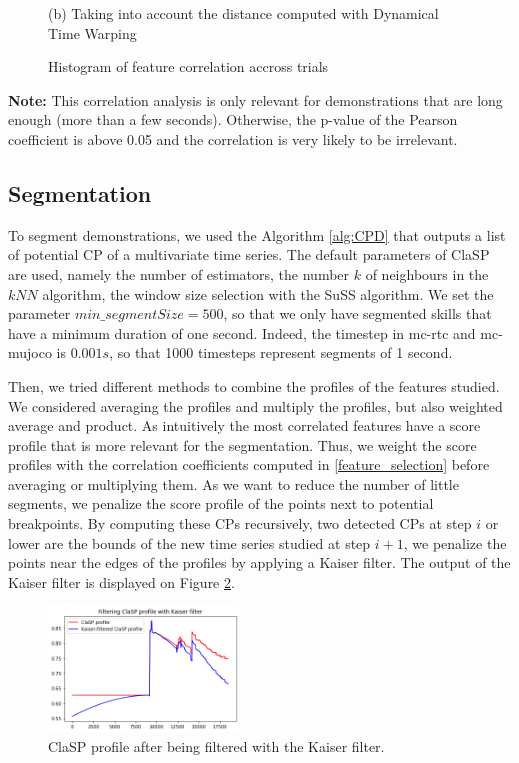 \documentclass[conference]{IEEEtran}
\begin{document}
\begin{figure}[ht]
\begin{minipage}[b]{0.47\linewidth}
    \caption*{(b) Taking into account the  distance computed with Dynamical Time Warping}
    \label{fig:histdtw}
  \end{minipage}

\caption{Histogram of feature correlation accross trials }
  \label{fig:histcorr}
\end{figure}

\textbf{Note:} This correlation analysis is only relevant for demonstrations that are long enough (more than a few seconds). Otherwise, the p-value of the Pearson coefficient \cite{pearson} is above 0.05 and the correlation is very likely to be irrelevant.

\subsection{Segmentation} \label{method_segmentation}

To segment demonstrations, we used the  Algorithm \ref{alg:CPD} that outputs a list  of potential CP of a multivariate time series. The default parameters of  ClaSP are used, namely the  number of estimators, the number $k$ of neighbours in the $kNN$ algorithm, the window size selection with the  SuSS algorithm. We set the parameter $min\_segmentSize = 500$, so that we only have segmented skills that have a minimum duration of one second. Indeed, the timestep in mc-rtc and mc-mujoco \cite{singh2023mc} is $0.001s$, so that 1000 timesteps represent segments of 1 second. 

Then, we tried different methods to combine the profiles of the features studied. We considered averaging the profiles and multiply the profiles, but also weighted average and product. As intuitively the most correlated features have a score profile that is more relevant for the segmentation. Thus, we weight the score profiles with the correlation coefficients computed in \ref{feature_selection} before averaging or multiplying them. As we want to reduce the number of little segments, we penalize the score profile of the points next to potential breakpoints. By computing these CPs recursively, two detected CPs at step $i$ or lower are the bounds of the new time series studied at step $i+1$, we penalize the points near the edges of the profiles by applying a Kaiser filter. The output of the Kaiser filter is displayed on Figure \ref{fig:Kaiser}.

\begin{figure}[ht]
  \centering
  \includegraphics[width=0.45\textwidth]{img/Kaiser filter.png}
  \caption{ClaSP profile after being filtered with the Kaiser filter.}
  \label{fig:Kaiser}
\end{figure}
\end{document}
